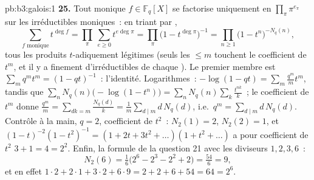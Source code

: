 \begin{solution}{pb:b3:galois:1}
\textbf{25.} Tout monique $f \in \mathbb F_q[X]$ se factorise
uniquement en $\prod_\pi\pi^{e_\pi}$ sur les irréductibles
moniques~: en triant par ,
\[
\sum_{f \text{ monique}}t^{\deg f}
= \prod_\pi\ \sum_{e \geq 0}t^{e\deg\pi}
= \prod_\pi\bigl(1 - t^{\deg\pi}\bigr)^{-1}
= \prod_{n \geq 1}\bigl(1 - t^n\bigr)^{-N_q(n)},
\]
tous les produits $t$-adiquement légitimes (seuls les 
$\leq m$ touchent le coefficient de $t^m$, et il y a
finement d'irréductibles de chaque ). Le premier membre
est $\sum_m q^mt^m = (1 - qt)^{-1}$~: l'identité. Logarithmes~:
$-\log(1 - qt) = \sum_m\frac{q^m}mt^m$, tandis que
$\sum_nN_q(n)\bigl(-\log(1 - t^n)\bigr) =
\sum_nN_q(n)\sum_k\frac{t^{nk}}k$~; le coefficient de $t^m$
donne $\frac{q^m}m = \sum_{dk = m} \frac{N_q(d)}k =
\frac1m\sum_{d \mid m}d\,N_q(d)$, i.e.\ $q^m =
\sum_{d\mid m}d\,N_q(d)$. Contrôle à la main, $q = 2$,
coefficient de $t^2$~: $N_2(1) = 2$, $N_2(2) = 1$, et $(1 -
t)^{-2}(1 - t^2)^{-1} = (1 + 2t + 3t^2 + \dots)(1 + t^2 +
\dots)$ a pour coefficient de $t^2$ $3 + 1 = 4 = 2^2$.
Enfin, la formule de la question 21 avec les diviseurs $1, 2,
3, 6$~:
\[
N_2(6) = \tfrac16\bigl(2^6 - 2^3 - 2^2 + 2\bigr)
= \tfrac{54}6 = 9,
\]
et en effet $1\cdot2 + 2\cdot1 + 3\cdot2 + 6\cdot9 = 2 + 2 +
6 + 54 = 64 = 2^6$.
\end{solution}
